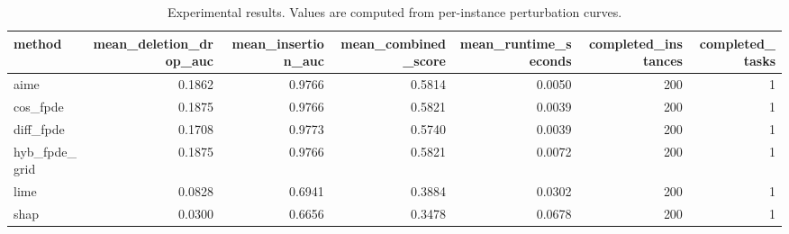 \begin{table}[t]
\caption{Experimental results. Values are computed from per-instance perturbation curves.}
\label{tab:main_results_computed}
\centering
\begin{tabular}{lrrrrrr}
\toprule
method & mean\_deletion\_drop\_auc & mean\_insertion\_auc & mean\_combined\_score & mean\_runtime\_seconds & completed\_instances & completed\_tasks \\
\midrule
aime & 0.1862 & 0.9766 & 0.5814 & 0.0050 & 200 & 1 \\
cos\_fpde & 0.1875 & 0.9766 & 0.5821 & 0.0039 & 200 & 1 \\
diff\_fpde & 0.1708 & 0.9773 & 0.5740 & 0.0039 & 200 & 1 \\
hyb\_fpde\_grid & 0.1875 & 0.9766 & 0.5821 & 0.0072 & 200 & 1 \\
lime & 0.0828 & 0.6941 & 0.3884 & 0.0302 & 200 & 1 \\
shap & 0.0300 & 0.6656 & 0.3478 & 0.0678 & 200 & 1 \\
\bottomrule
\end{tabular}

\end{table}
